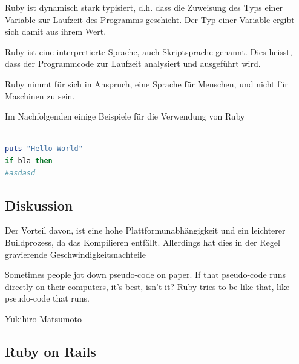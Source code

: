 Ruby ist dynamisch stark typisiert, d.h. dass die Zuweisung des Typs einer Variable zur Laufzeit des Programms geschieht. Der Typ einer Variable ergibt sich damit aus ihrem Wert.

Ruby ist eine interpretierte Sprache, auch Skriptsprache genannt. Dies heisst, dass der Programmcode zur Laufzeit analysiert und ausgeführt wird. 

Ruby nimmt für sich in Anspruch, eine Sprache für Menschen, und nicht für Maschinen zu sein.

\setlength{\epigraphwidth}{\marginparwidth}
\setlength{\epigraphwidth}{0.8\textwidth}

Im Nachfolgenden einige Beispiele für die Verwendung von Ruby

\begin{lstlisting}[language=Ruby,label=DescriptiveLabel,caption=Beispiele für Rubycode]
 
puts "Hello World"
if bla then
#asdasd
\end{lstlisting}


\subsection{Diskussion}

Der Vorteil davon, ist eine hohe Plattformunabhängigkeit und ein leichterer Buildprozess, da das Kompilieren entfällt. Allerdings hat dies in der Regel gravierende Geschwindigkeitsnachteile

\epigraph{Sometimes people jot down pseudo-code on paper. If that pseudo-code runs directly on their computers, it's best, isn't it? Ruby tries to be like that, like pseudo-code that runs. }{Yukihiro Matsumoto}

\subsection{Ruby on Rails}







